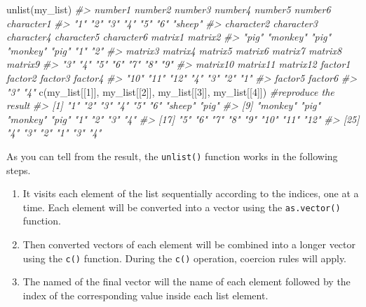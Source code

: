 \documentclass[
]{book}
\newenvironment{Shaded}{\begin{snugshade}}{\end{snugshade}}
\newcommand{\CommentTok}[1]{\textcolor[rgb]{0.56,0.35,0.01}{\textit{#1}}}
\newcommand{\DecValTok}[1]{\textcolor[rgb]{0.00,0.00,0.81}{#1}}
\newcommand{\FunctionTok}[1]{\textcolor[rgb]{0.00,0.00,0.00}{#1}}
\newcommand{\NormalTok}[1]{#1}
\providecommand{\tightlist}{%
  \setlength{\itemsep}{0pt}\setlength{\parskip}{0pt}}
\begin{document}
\begin{Shaded}
\begin{Highlighting}[]
\FunctionTok{unlist}\NormalTok{(my\_list)}
\CommentTok{\#\textgreater{}    number1    number2    number3    number4    number5    number6 character1 }
\CommentTok{\#\textgreater{}        "1"        "2"        "3"        "4"        "5"        "6"    "sheep" }
\CommentTok{\#\textgreater{} character2 character3 character4 character5 character6    matrix1    matrix2 }
\CommentTok{\#\textgreater{}      "pig"   "monkey"      "pig"   "monkey"      "pig"        "1"        "2" }
\CommentTok{\#\textgreater{}    matrix3    matrix4    matrix5    matrix6    matrix7    matrix8    matrix9 }
\CommentTok{\#\textgreater{}        "3"        "4"        "5"        "6"        "7"        "8"        "9" }
\CommentTok{\#\textgreater{}   matrix10   matrix11   matrix12    factor1    factor2    factor3    factor4 }
\CommentTok{\#\textgreater{}       "10"       "11"       "12"        "4"        "3"        "2"        "1" }
\CommentTok{\#\textgreater{}    factor5    factor6 }
\CommentTok{\#\textgreater{}        "3"        "4"}
\FunctionTok{c}\NormalTok{(my\_list[[}\DecValTok{1}\NormalTok{]], my\_list[[}\DecValTok{2}\NormalTok{]], my\_list[[}\DecValTok{3}\NormalTok{]], my\_list[[}\DecValTok{4}\NormalTok{]]) }\CommentTok{\#reproduce the result}
\CommentTok{\#\textgreater{}  [1] "1"      "2"      "3"      "4"      "5"      "6"      "sheep"  "pig"   }
\CommentTok{\#\textgreater{}  [9] "monkey" "pig"    "monkey" "pig"    "1"      "2"      "3"      "4"     }
\CommentTok{\#\textgreater{} [17] "5"      "6"      "7"      "8"      "9"      "10"     "11"     "12"    }
\CommentTok{\#\textgreater{} [25] "4"      "3"      "2"      "1"      "3"      "4"}
\end{Highlighting}
\end{Shaded}

As you can tell from the result, the \texttt{unlist()} function works in the following steps.

\begin{enumerate}
\def\labelenumi{\arabic{enumi}.}
\tightlist
\item
  It visits each element of the list sequentially according to the indices, one at a time. Each element will be converted into a vector using the \texttt{as.vector()} function.
\item
  Then converted vectors of each element will be combined into a longer vector using the \texttt{c()} function. During the \texttt{c()} operation, coercion rules will apply.
\item
  The named of the final vector will the name of each element followed by the index of the corresponding value inside each list element.
\end{enumerate}
\end{document}
